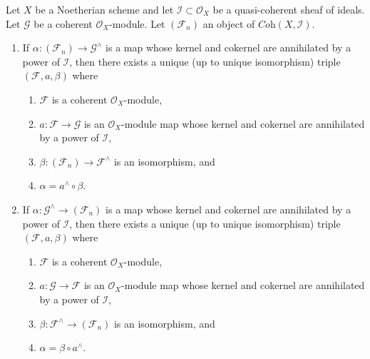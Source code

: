 \begin{lemma}
\label{lemma-existence-easy}
Let $X$ be a Noetherian scheme and let $\mathcal{I} \subset \mathcal{O}_X$
be a quasi-coherent sheaf of ideals. Let $\mathcal{G}$ be a coherent
$\mathcal{O}_X$-module. Let $(\mathcal{F}_n)$ an object of
$\textit{Coh}(X, \mathcal{I})$.
\begin{enumerate}
\item If $\alpha : (\mathcal{F}_n) \to \mathcal{G}^\wedge$ is
a map whose kernel and cokernel are annihilated by a power of $\mathcal{I}$,
then there exists a unique (up to unique isomorphism) triple
$(\mathcal{F}, a, \beta)$ where
\begin{enumerate}
\item $\mathcal{F}$ is a coherent $\mathcal{O}_X$-module,
\item $a : \mathcal{F} \to \mathcal{G}$ is an $\mathcal{O}_X$-module map
whose kernel and cokernel are annihilated by a power of $\mathcal{I}$,
\item $\beta : (\mathcal{F}_n) \to \mathcal{F}^\wedge$ is an isomorphism, and
\item $\alpha = a^\wedge \circ \beta$.
\end{enumerate}
\item If $\alpha : \mathcal{G}^\wedge \to (\mathcal{F}_n)$ is
a map whose kernel and cokernel are annihilated by a power of $\mathcal{I}$,
then there exists a unique (up to unique isomorphism) triple
$(\mathcal{F}, a, \beta)$ where
\begin{enumerate}
\item $\mathcal{F}$ is a coherent $\mathcal{O}_X$-module,
\item $a : \mathcal{G} \to \mathcal{F}$ is an $\mathcal{O}_X$-module map
whose kernel and cokernel are annihilated by a power of $\mathcal{I}$,
\item $\beta : \mathcal{F}^\wedge \to (\mathcal{F}_n)$ is an isomorphism, and
\item $\alpha = \beta \circ a^\wedge$.
\end{enumerate}
\end{enumerate}
\end{lemma}


